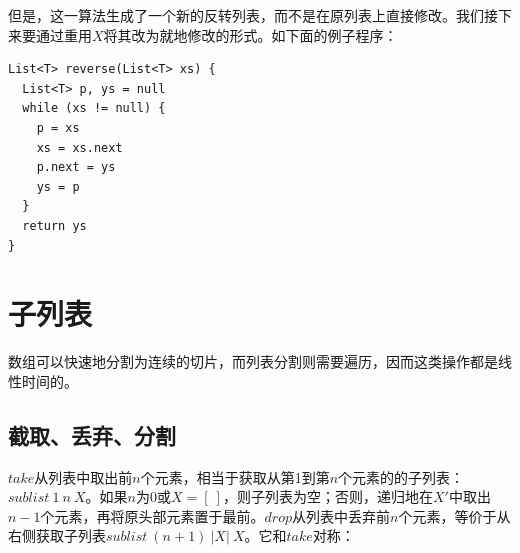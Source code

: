 \documentclass[b5paper]{ctexart}
\begin{document}
但是，这一算法生成了一个新的反转列表，而不是在原列表上直接修改。我们接下来要通过重用$X$将其改为就地修改的形式。如下面的例子程序：

\begin{lstlisting}[language=Bourbaki]
List<T> reverse(List<T> xs) {
  List<T> p, ys = null
  while (xs != null) {
    p = xs
    xs = xs.next
    p.next = ys
    ys = p
  }
  return ys
}
\end{lstlisting}

\begin{Exercise}
\end{Exercise}

\section{子列表}

数组可以快速地分割为连续的切片，而列表分割则需要遍历，因而这类操作都是线性时间的。

\subsection{截取、丢弃、分割}
  

$take$从列表中取出前$n$个元素，相当于获取从第1到第$n$个元素的的子列表：$sublist\ 1\ n\ X$。如果$n$为0或$X = [\ ]$，则子列表为空；否则，递归地在$X'$中取出$n-1$个元素，再将原头部元素置于最前。$drop$从列表中丢弃前$n$个元素，等价于从右侧获取子列表$sublist\ (n+1)\ |X|\ X$。它和$take$对称：

\be
{}
\ee
\end{document}

